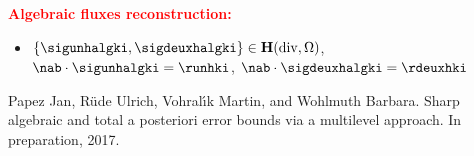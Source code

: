 \documentclass[10 pt]{beamer}
\renewcommand{\div}{\mathrm{div}}
\begin{document}
\begin{frame}
\vspace{0.3 cm}
\textcolor{red}{\textbf{Algebraic fluxes reconstruction:}}
\begin{itemize}

\item $\left\{\sigunhalgki,\sigdeuxhalgki\right\} \in \textbf H(\div,\Omega)$, \: $\nab \cdot \sigunhalgki=\runhki$, \: $\nab \cdot \sigdeuxhalgki=\rdeuxhki$
\end{itemize}



\scriptsize
\begin{thebibliography}{10}
Papez Jan, Rüde Ulrich, Vohral{\'{\i}}k Martin, and Wohlmuth Barbara.
\newblock Sharp algebraic and total a posteriori error bounds via a multilevel
approach.
\newblock In preparation, 2017.
\end{thebibliography}
\end{frame}
\end{document}
